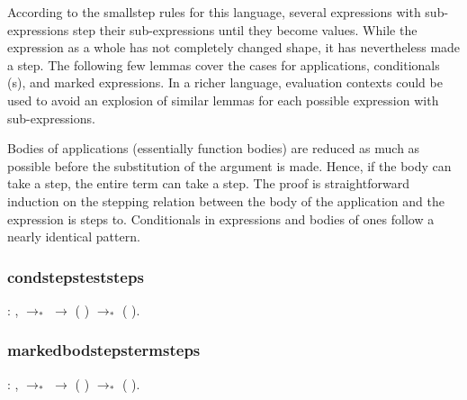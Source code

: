 \documentclass[12pt]{report}
\begin{document}
According to the smallstep rules for this language, several
expressions with sub-expressions step their sub-expressions until
they become values. While the expression as a whole has not
completely changed shape, it has nevertheless made a step. The
following few lemmas cover the cases for applications, conditionals
(s), and marked expressions. In a richer language,
evaluation contexts could be used to avoid an explosion of similar
lemmas for each possible expression with sub-expressions. 

Bodies of applications (essentially function bodies) are reduced as
much as possible before the substitution of the argument is made.
Hence, if the body can take a step, the entire term can take a step.
The proof is straightforward induction on the stepping relation
between the body of the application and the expression is steps to.
Conditionals in  expressions and bodies of
 ones follow a nearly identical pattern. 

\subsubsection{condstepsteststeps}

\begin{coqdoccode}
\coqdocemptyline
\coqdocindent{1.00em}
  : \coqdockw{\ensuremath{\forall}}    ,\coqdoceol
\coqdocindent{2.00em}
 $\to_*$  \ensuremath{\rightarrow}\coqdoceol
\coqdocindent{2.00em}
(   ) $\to_*$ (   ).\coqdoceol
\coqdocemptyline
\end{coqdoccode}
\subsubsection{markedbodstepstermsteps}

\begin{coqdoccode}
\coqdocemptyline
\coqdocindent{1.00em}
  : \coqdockw{\ensuremath{\forall}}   ,\coqdoceol
\coqdocindent{2.00em}
 $\to_*$  \ensuremath{\rightarrow}\coqdoceol
\coqdocindent{2.00em}
(  ) $\to_*$ (  ).\coqdoceol
\coqdocemptyline
\end{coqdoccode}
\end{document}
